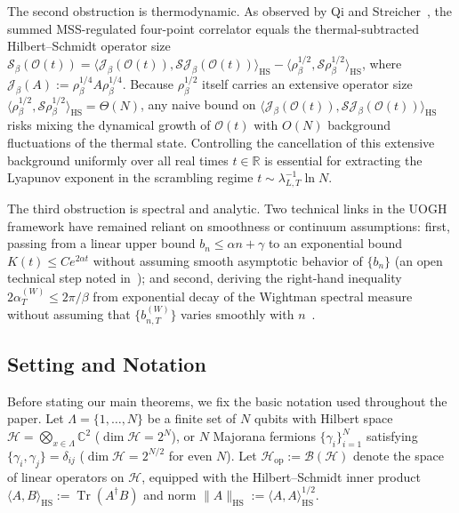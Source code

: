 \documentclass[11pt,a4paper]{article}
\numberwithin{equation}{section}
\theoremstyle{plain}
\theoremstyle{definition}
\newcommand{\Hop}{\mathcal{H}_{\mathrm{op}}}
\newcommand{\HS}{\mathrm{HS}}
\newcommand{\Tr}{\operatorname{Tr}}
\begin{document}
The second obstruction is thermodynamic. As observed by Qi and Streicher~\cite{Qi2019}, the summed MSS-regulated four-point correlator equals the thermal-subtracted Hilbert--Schmidt operator size $\mathcal{S}_\beta(\mathcal{O}(t)) = \langle\mathcal{J}_\beta(\mathcal{O}(t)), \mathcal{S}\mathcal{J}_\beta(\mathcal{O}(t))\rangle_\HS - \langle\rho_\beta^{1/2},\mathcal{S}\rho_\beta^{1/2}\rangle_\HS$, where $\mathcal{J}_\beta(A) := \rho_\beta^{1/4} A \rho_\beta^{1/4}$. Because $\rho_\beta^{1/2}$ itself carries an extensive operator size $\langle\rho_\beta^{1/2},\mathcal{S}\rho_\beta^{1/2}\rangle_\HS = \Theta(N)$, any naive bound on $\langle\mathcal{J}_\beta(\mathcal{O}(t)),\mathcal{S}\mathcal{J}_\beta(\mathcal{O}(t))\rangle_\HS$ risks mixing the dynamical growth of $\mathcal{O}(t)$ with $O(N)$ background fluctuations of the thermal state. Controlling the cancellation of this extensive background uniformly over all real times $t\in\mathbb{R}$ is essential for extracting the Lyapunov exponent in the scrambling regime $t \sim \lambda_{L,T}^{-1}\ln N$.

The third obstruction is spectral and analytic. Two technical links in the UOGH framework have remained reliant on smoothness or continuum assumptions: first, passing from a linear upper bound $b_n \le \alpha n + \gamma$ to an exponential bound $K(t) \le C e^{2\alpha t}$ without assuming smooth asymptotic behavior of $\{b_n\}$ (an open technical step noted in~\cite[Sec.~V.1]{Parker2019}); and second, deriving the right-hand inequality $2\alpha_T^{(W)} \le 2\pi/\beta$ from exponential decay of the Wightman spectral measure without assuming that $\{b_{n,T}^{(W)}\}$ varies smoothly with $n$~\cite{Parker2019,Avdoshkin2020}.

\subsection{Setting and Notation}\label{subsec:intro-notation}

Before stating our main theorems, we fix the basic notation used throughout the paper. Let $\Lambda = \{1,\dots,N\}$ be a finite set of $N$ qubits with Hilbert space $\mathcal{H} = \bigotimes_{x\in\Lambda}\mathbb{C}^2$ ($\dim\mathcal{H}=2^N$), or $N$ Majorana fermions $\{\gamma_i\}_{i=1}^N$ satisfying $\{\gamma_i,\gamma_j\}=\delta_{ij}$ ($\dim\mathcal{H}=2^{N/2}$ for even $N$). Let $\Hop := \mathcal{B}(\mathcal{H})$ denote the space of linear operators on $\mathcal{H}$, equipped with the Hilbert--Schmidt inner product $\langle A,B\rangle_\HS := \Tr(A^\dagger B)$ and norm $\|A\|_\HS := \langle A,A\rangle_\HS^{1/2}$.
\end{document}
